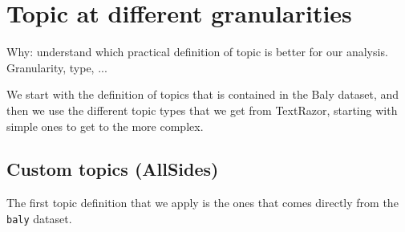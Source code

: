 





\section{Topic at different granularities}
\label{sec:topic_topic_granularities}
Why: understand which practical definition of topic is better for our analysis. Granularity, type, ...




We start with the definition of topics that is contained in the Baly dataset, and then we use the different topic types that we get from TextRazor, starting with simple ones to get to the more complex.

\subsection{Custom topics (AllSides)}

The first topic definition that we apply is the ones that comes directly from the \texttt{baly} dataset.

